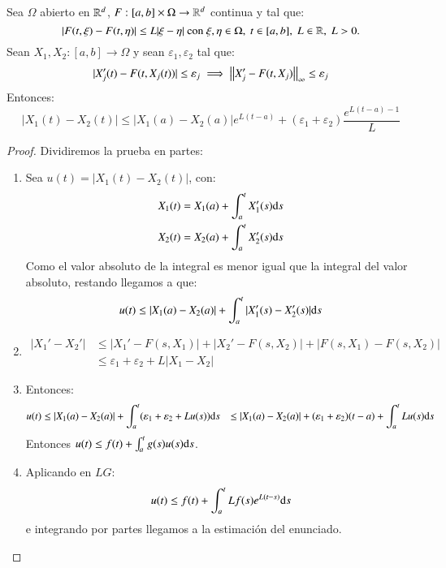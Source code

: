 \begin{pro}\label{pro:dif-sol-cot}
    Sea $\Omega$ abierto en $\mathbb{R}^d$, $F:[a, b] \times \Omega \to \mathbb{R}^d$ continua y tal que:
    $$
            |F(t, \xi) - F(t, \eta)| \leq  L |\xi - \eta| \text{ con } \xi, \eta \in \Omega,\ t\in[a, b],\ L\in \R,\ L > 0.
    $$
    Sean $X_1, X_2 :[a, b] \to \Omega$ y sean $\varepsilon_1, \varepsilon_2$ tal que:
    $$
        |X_j'(t) - F(t, X_j(t))| \leq \varepsilon_j \implies \left|\left|X'_j - F(t, X_j)\right|\right|_\infty \leq \varepsilon_j
    $$
    Entonces:
    $$
        |X_1(t) - X_2(t) | \leq |X_1(a) - X_2(a)| e^{L(t-a)} + (\varepsilon_1 + \varepsilon_2) \frac{e^{L(t-a) - 1}}{L}
    $$
\end{pro}
\begin{proof}
    Dividiremos la prueba en partes:
    \begin{enumerate}
        \item Sea $u(t) = |X_1(t) - X_2(t)|$, con:
        \begin{gather*}
            X_1(t) = X_1(a) + \int_a^t X_1'(s) \mathrm{d} s\\
            X_2(t) = X_2(a) + \int_a^t X_2'(s) \mathrm{d} s
        \end{gather*}
        Como el valor absoluto de la integral es menor igual que la integral del valor absoluto, restando llegamos a que:
        $$
            u(t) \leq |X_1(a) - X_2(a)| + \int_a^t |X_1'(s) - X_2'(s)| \mathrm{d} s
        $$
        \item
        \begin{align*}
            |X_1' - X_2'| &\leq |X_1' - F(s, X_1)| + |X_2' - F(s, X_2)| + |F(s, X_1) - F(s, X_2)|\\
            &\leq \varepsilon_1 + \varepsilon_2 + L|X_1 - X_2|
        \end{align*}
        \item Entonces:
        \begin{align*}
            u(t) &\leq |X_1(a) - X_2(a)| + \int_a^t (\varepsilon_1 + \varepsilon_2 + L u(s) ) \mathrm{d} s
                 &\leq |X_1(a) - X_2(a)| + (\varepsilon_1 + \varepsilon_2)(t-a) + \int_a^t L u(s) \mathrm{d} s
        \end{align*}
        Entonces $u(t) \leq f(t) + \int_a^t g(s) u(s) \mathrm{d} s$.
        \item Aplicando en $LG$:
        $$
            u(t) \leq f(t) + \int_a^t L f(s) e^{L(t-s)} \mathrm{d} s
        $$
        e integrando por partes llegamos a la estimación del enunciado.
    \end{enumerate}
\end{proof}
